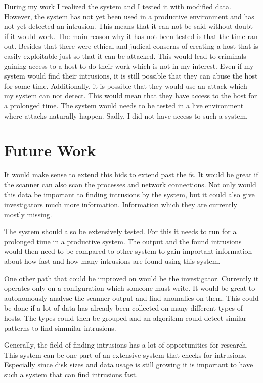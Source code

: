 \documentclass[
	a4paper,					%
	10pt,							%
	twoside,					%
	openright,				%
	notitlepage,			%
	parskip=half,			%
]{scrreprt}					%
\begin{document}
During my work I realized the system and I tested it with modified data. However, the system has not yet been used in a productive environment and has not yet detected an intrusion. This means that it can not be said without doubt if it would work. The main reason why it has not been tested is that the time ran out. Besides that there were ethical and judical conserns of creating a host that is easily exploitable just so that it can be attacked. This would lead to criminals gaining access to a host to do their work which is not in my interest. Even if my system would find their intrusions, it is still possible that they can abuse the host for some time. Additionally, it is possible that they would use an attack which my system can not detect. This would mean that they have access to the host for a prolonged time. The system would needs to be tested in a live environment where attacks naturally happen. Sadly, I did not have access to such a system. 

\section{Future Work}
\label{sec:future:work}

It would make sense to extend this \gls{hids} to extend past the \gls{fs}. It would be great if the scanner can also scan the processes and network connections. Not only would this data be important to finding intrusions by the system, but it could also give investigators much more information. Information which they are currently mostly missing.

The system should also be extensively tested. For this it needs to run for a prolonged time in a productive system. The output and the found intrusions would then need to be compared to other system to gain important information about how fast and how many intrusions are found using this system. 

One other path that could be improved on would be the investigator. Currently it operates only on a configuration which someone must write. It would be great to autonomously analyse the scanner output and find anomalies on them. This could be done if a lot of data has already been collected on many different types of hosts. The types could then be grouped and an algorithm could detect similar patterns to find simmilar intrusions. 

Generally, the field of finding intrusions has a lot of opportunities for research. This system can be one part of an extensive system that checks for intrusions. Especially since disk sizes and data usage is still growing it is important to have such a system that can find intrusions fast.
\end{document}

